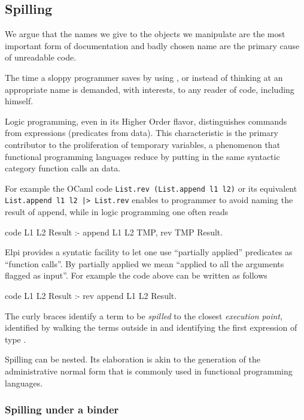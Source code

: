 \documentclass[a4paper, 11pt]{book}
\begin{document}
\subsection{Spilling}

We argue that the names we give to the objects we manipulate
are the most important form of documentation and badly chosen
name are the primary cause of unreadable code.

The time a sloppy programmer saves by using , 
or  instead of thinking at an appropriate name is
demanded, with interests, to any reader of code, including himself.

Logic programming, even in its Higher Order flavor, distinguishes
commands from expressions (predicates from data). This characteristic
is the primary contributor to the proliferation of temporary
variables, a phenomenon that functional programming languages
reduce by putting in the same syntactic category function calls an
data. 

For example the OCaml code \texttt{List.rev (List.append l1 l2)}
or its equivalent \texttt{List.append l1 l2 |> List.rev} enables
to programmer to avoid naming the result of append, while in logic
programming one often reads

\begin{elpicode}
code L1 L2 Result :- append L1 L2 TMP, rev TMP Result.
\end{elpicode}

Elpi provides a syntatic facility to let one use
``partially applied'' predicates as ``function calls''.
By partially applied we mean ``applied to all the arguments flagged as input''.
For example the code above can be written as follows

\begin{elpicode}
code L1 L2 Result :- rev {append L1 L2} Result.
\end{elpicode}

The curly braces identify a term to be \emph{spilled} to the closest
\emph{execution point}, identified by walking the terms outside in and
identifying the first expression of type .

Spilling can be nested. Its elaboration is akin to the generation
of the administrative normal form that is commonly used in functional
programming languages.

\subsubsection{Spilling under a binder}
\end{document}
